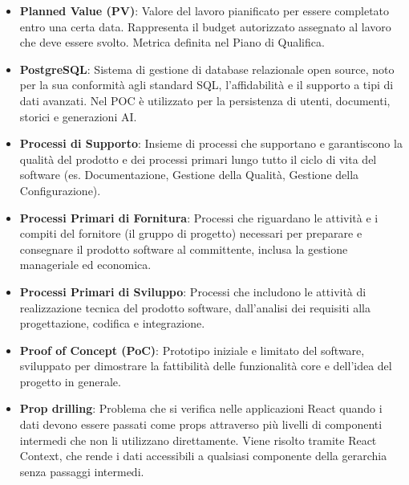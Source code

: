 \documentclass[11pt,a4paper]{article}
\begin{document}
\begin{itemize}
\item \textbf{Planned Value (PV)}: Valore del lavoro pianificato per essere completato entro una certa data. Rappresenta il budget autorizzato assegnato al lavoro che deve essere svolto. Metrica definita nel Piano di Qualifica.

\item \textbf{PostgreSQL}: Sistema di gestione di database relazionale 
open source, noto per la sua conformità agli standard SQL, 
l'affidabilità e il supporto a tipi di dati avanzati. Nel POC è utilizzato per la persistenza di utenti, documenti, storici e generazioni AI.

\item \textbf{Processi di Supporto}: Insieme di processi che supportano e garantiscono la qualità del prodotto e dei processi primari lungo tutto il ciclo di vita del software (es. Documentazione, Gestione della Qualità, Gestione della Configurazione).

\item \textbf{Processi Primari di Fornitura}: Processi che riguardano le attività e i compiti del fornitore (il gruppo di progetto) necessari per preparare e consegnare il prodotto software al committente, inclusa la gestione manageriale ed economica.

\item \textbf{Processi Primari di Sviluppo}: Processi che includono le attività di realizzazione tecnica del prodotto software, dall'analisi dei requisiti alla progettazione, codifica e integrazione.

\item \textbf{Proof of Concept (PoC)}: Prototipo iniziale e limitato del software, sviluppato per dimostrare la fattibilità delle funzionalità core e dell'idea del progetto in generale.

\item \textbf{Prop drilling}: Problema che si verifica nelle applicazioni 
React quando i dati devono essere passati come props attraverso 
più livelli di componenti intermedi che non li utilizzano direttamente. Viene risolto tramite React Context, che rende i dati accessibili a qualsiasi componente della gerarchia senza passaggi intermedi.

\end{itemize}
\newpage
\end{document}
